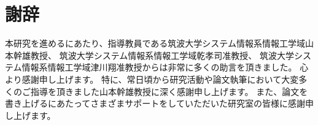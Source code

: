 \documentclass[a4paper,11pt]{jreport}
\begin{document}
\chapter*{謝辞}
本研究を進めるにあたり、指導教員である筑波大学システム情報系情報工学域山本幹雄教授、
筑波大学システム情報系情報工学域乾孝司准教授、
筑波大学システム情報系情報工学域津川翔准教授からは非常に多くの助言を頂きました。
心より感謝申し上げます。
特に、常日頃から研究活動や論文執筆において大変多くのご指導を頂きました山本幹雄教授に深く感謝申し上げます。
また、論文を書き上げるにあたってさまざまサポートをしていただいた研究室の皆様に感謝申し上げます。










\newpage
{}
\renewcommand{\bibname}{参考文献}
\end{document}
